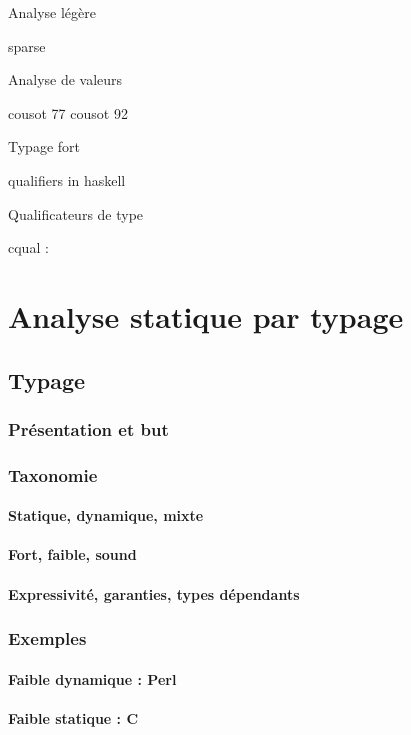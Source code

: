 \documentclass{phdthesis}
\begin{document}
Analyse légère

  sparse
  \cite{TorvaldsSparse}

Analyse de valeurs

cousot 77 \cite{Cousot77}
cousot 92 \cite{Cousot92-1}

Typage fort

  qualifiers in haskell
  \cite{lightweight-static-capabilities}
  \cite{LZ06a}

Qualificateurs de type

  cqual :
  \cite{pldi99,usenix01,pldi02,cquk-usenix04,toplas-quals}

\part{Analyse statique par typage}

\chapter{Typage}

\section{Présentation et but}
\section{Taxonomie}

\subsection{Statique, dynamique, mixte}
\subsection{Fort, faible, sound}
\subsection{Expressivité, garanties, types dépendants}

\section{Exemples}

\subsection{Faible dynamique : Perl}
\subsection{Faible statique : C}
\end{document}
